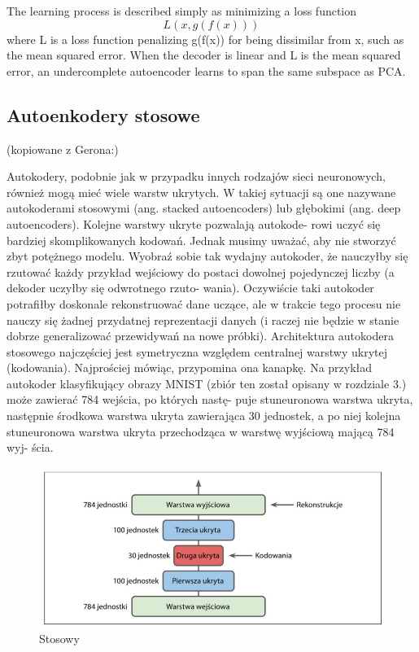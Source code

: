 \documentclass[12pt]{mwbk}
\theoremstyle{plain}
\theoremstyle{definition}
\theoremstyle{remark}
\newcommand\zrodlo[1]{\par\vspace{-3mm}{\small\textit{Źródło: }#1 }}
\begin{document}
The learning process is described simply as minimizing a loss function
$$L(x, g(f(x)))$$
where L is a loss function penalizing g(f(x)) for being dissimilar from x, such as
the mean squared error.
When the decoder is linear and L is the mean squared error, an undercomplete
autoencoder learns to span the same subspace as PCA.

\subsection{Autoenkodery stosowe}

(kopiowane z Gerona:)

Autokodery, podobnie jak w przypadku innych rodzajów sieci neuronowych, również mogą mieć
wiele warstw ukrytych. W takiej sytuacji są one nazywane autokoderami stosowymi (ang. stacked
autoencoders) lub głębokimi (ang. deep autoencoders). Kolejne warstwy ukryte pozwalają autokode-
rowi uczyć się bardziej skomplikowanych kodowań. Jednak musimy uważać, aby nie stworzyć
zbyt potężnego modelu. Wyobraź sobie tak wydajny autokoder, że nauczyłby się rzutować każdy
przykład wejściowy do postaci dowolnej pojedynczej liczby (a dekoder uczyłby się odwrotnego rzuto-
wania). Oczywiście taki autokoder potrafiłby doskonale rekonstruować dane uczące, ale w trakcie
tego procesu nie nauczy się żadnej przydatnej reprezentacji danych (i raczej nie będzie w stanie dobrze
generalizować przewidywań na nowe próbki).
Architektura autokodera stosowego najczęściej jest symetryczna względem centralnej warstwy ukrytej
(kodowania). Najprościej mówiąc, przypomina ona kanapkę. Na przykład autokoder klasyfikujący
obrazy MNIST (zbiór ten został opisany w rozdziale 3.) może zawierać 784 wejścia, po których nastę-
puje stuneuronowa warstwa ukryta, następnie środkowa warstwa ukryta zawierająca 30 jednostek,
a po niej kolejna stuneuronowa warstwa ukryta przechodząca w warstwę wyjściową mającą 784 wyj-
ścia.


\begin{figure}[!h]
	\centering
	\includegraphics[width=\linewidth]{rys/autoenkoder_stosowy.png}
	\caption{Stosowy}
	\zrodlo{\cite{geron}}
	\label{fig:autoenkoder-stosowy}
\end{figure}
\end{document}
